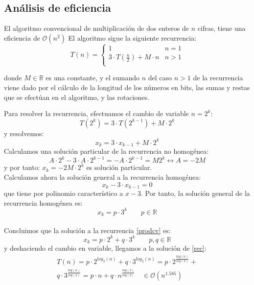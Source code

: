 \documentclass[a4paper, 11pt]{article} %
\begin{document}
\subsection{Análisis de eficiencia}
El algoritmo convencional de multiplicación de dos enteros de $n$ cifras, tiene una eficiencia de $\mathcal{O}(n^2)$
El algoritmo sigue la siguiente recurrencia:
\begin{equation}\label{rec}
 T(n)=\left\lbrace
	    \begin{array}{lr}
            1 & n=1\\
            3\cdot T\left(\frac{n}{2}\right) + M\cdot n & n>1\\
            \end{array}
	    \right.
\end{equation}

donde $M\in\mathbb{R}$ es una constante, y el sumando $n$ del caso $n>1$ de la recurrencia viene dado por el cálculo
de la longitud de los números en bits, las sumas y restas que se efectúan en el algoritmo, y las rotaciones.

Para resolver la recurrencia, efectuamos el cambio de variable $n=2^k$:
\begin{equation}\label{prodcv}
 T(2^k)=3\cdot T(2^{k-1}) + M\cdot 2^k
\end{equation}
y resolvemos: 
\begin{equation}
x_k=3\cdot x_{k-1}+M\cdot 2^k
\end{equation}
Calculamos una solución particular de la recurrencia no homogénea:
$$A\cdot 2^k - 3\cdot A \cdot 2^{k-1}=-A\cdot 2^{k-1}=M2^k \leftrightarrow A=-2M$$
y por tanto: $x_k=-2M \cdot 2^k$ es solución particular.\\

Calculamos ahora la solución general a la recurrencia homogénea:
$$ x_k-3\cdot x_{k-1}=0$$
que tiene por polinomio característico a $x-3$. Por tanto, la solución general de la
recurrencia homogénea es:
$$ x_k= p\cdot 3^k\qquad p\in\mathbb{R}$$\\
Concluimos que la solución a la recurrencia \ref{prodcv} es: 
\begin{equation}
x_k = p \cdot 2^k + q \cdot 3^k \qquad p,q \in \mathbb{R}
\end{equation}
y deshaciendo el cambio en variable, llegamos a la solución de \ref{rec}:
\begin{eqnarray*}
T(n)=p \cdot 2^{log_2(n)} + q \cdot 3^{log_2(n)} = p \cdot 2^{\frac{log(n)}{log(2)}} +\\
q \cdot 3^{\frac{log(n)}{log(2)}}=p \cdot n + q \cdot n^{\frac{log(3)}{log(2)}} \quad \in \mathcal{O}(n^{1.585})
\end{eqnarray*}
\end{document}
